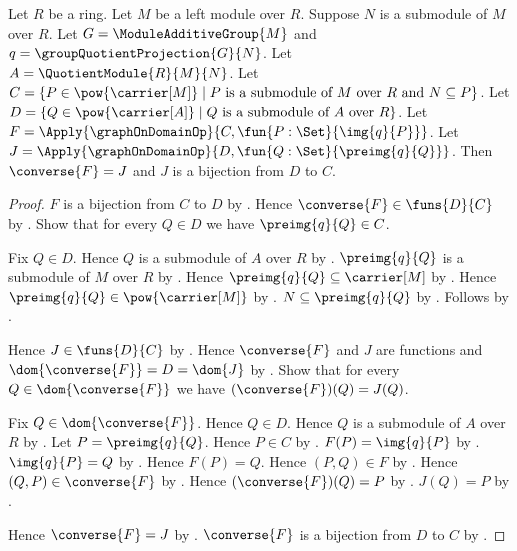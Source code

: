 \begin{theorem}\label{module_submodule_correspondence_inverse_graph}
    Let $R$ be a ring.
    Let $M$ be a left module over $R$.
    Suppose $N$ is a submodule of $M$ over $R$.
    Let $G=\ModuleAdditiveGroup{M}$ and
        $q=\groupQuotientProjection{G}{N}$.
    Let $A=\QuotientModule{R}{M}{N}$.
    Let
        $C=\{P\in\pow{\carrier[M]}\mid
            \text{$P$ is a submodule of $M$ over $R$ and
                $N\subseteq P$}\}$.
    Let
        $D=\{Q\in\pow{\carrier[A]}\mid
            \text{$Q$ is a submodule of $A$ over $R$}\}$.
    Let
        $F=\Apply{\graphOnDomainOp}
            {C,\fun{P:\Set}{\img{q}{P}}}$.
    Let
        $J=\Apply{\graphOnDomainOp}
            {D,\fun{Q:\Set}{\preimg{q}{Q}}}$.
    Then $\converse{F}=J$ and $J$ is a bijection from $D$ to $C$.
\end{theorem}
\begin{proof}
    $F$ is a bijection from $C$ to $D$ by
        .
    Hence $\converse{F}\in\funs{D}{C}$ by
        .
    Show that for every $Q\in D$ we have $\preimg{q}{Q}\in C$.
    \begin{subproof}
        Fix $Q\in D$.
        Hence $Q$ is a submodule of $A$ over $R$ by \auto.
        $\preimg{q}{Q}$ is a submodule of $M$ over $R$ by
            .
        Hence $\preimg{q}{Q}\subseteq\carrier[M]$ by
            .
        Hence $\preimg{q}{Q}\in\pow{\carrier[M]}$ by
            .
        $N\subseteq\preimg{q}{Q}$ by
            .
        Follows by \auto.
    \end{subproof}
    Hence $J\in\funs{D}{C}$ by
        .
    Hence $\converse{F}$ and $J$ are functions and
        $\dom{\converse{F}}=D=\dom{J}$ by
        .
    Show that for every $Q\in\dom{\converse{F}}$ we have
        $(\converse{F})(Q)=J(Q)$.
    \begin{subproof}
        Fix $Q\in\dom{\converse{F}}$.
        Hence $Q\in D$.
        Hence $Q$ is a submodule of $A$ over $R$ by \auto.
        Let $P=\preimg{q}{Q}$.
        Hence $P\in C$ by \auto.
        $F(P)=\img{q}{P}$ by
            .
        $\img{q}{P}=Q$ by
            .
        Hence $F(P)=Q$.
        Hence $(P,Q)\in F$ by
            .
        Hence $(Q,P)\in\converse{F}$ by .
        Hence $(\converse{F})(Q)=P$ by
            .
        $J(Q)=P$ by .
    \end{subproof}
    Hence $\converse{F}=J$ by .
    $\converse{F}$ is a bijection from $D$ to $C$ by
        .
\end{proof}
